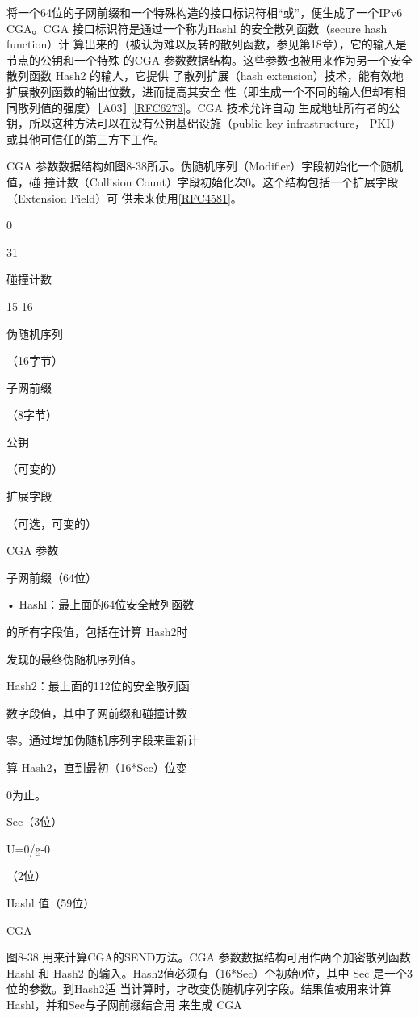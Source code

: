将一个64位的子网前缀和一个特殊构造的接口标识符相“或”，便生成了一个IPv6
CGA。CGA 接口标识符是通过一个称为Hashl 的安全散列函数（secure hash function）计
算出来的（被认为难以反转的散列函数，参见第18章），它的输入是节点的公钥和一个特殊
的CGA 参数数据结构。这些参数也被用来作为另一个安全散列函数 Hash2 的输人，它提供
了散列扩展（hash extension）技术，能有效地扩展散列函数的输出位数，进而提高其安全
性（即生成一个不同的输人但却有相同散列值的强度）［A03］\href{https://www.rfc-editor.org/rfc/rfc6273}{[RFC6273]}。CGA 技术允许自动
生成地址所有者的公钥，所以这种方法可以在没有公钥基础设施（public key infrastructure，
PKI） 或其他可信任的第三方下工作。

CGA 参数数据结构如图8-38所示。伪随机序列（Modifier）字段初始化一个随机值，碰
撞计数（Collision Count）字段初始化次0。这个结构包括一个扩展字段（Extension Field）可
供未来使用\href{https://www.rfc-editor.org/rfc/rfc4581}{[RFC4581]}。

0

31

碰撞计数

15 16

伪随机序列

（16字节）

子网前缀

（8字节）

公钥

（可变的）

扩展字段

（可选，可变的）

CGA 参数

子网前缀（64位）

• Hashl：最上面的64位安全散列函数

的所有字段值，包括在计算 Hash2时

发现的最终伪随机序列值。

Hash2：最上面的112位的安全散列函

数字段值，其中子网前缀和碰撞计数

零。通过增加伪随机序列字段来重新计

算 Hash2，直到最初（16*Sec）位变

0为止。

Sec（3位）

U=0/g-0

（2位）

Hashl 值（59位）

CGA

图8-38 用来计算CGA的SEND方法。CGA 参数数据结构可用作两个加密散列函数 Hashl 和 Hash2
的输入。Hash2值必须有（16*Sec）个初始0位，其中 Sec 是一个3位的参数。到Hash2适
当计算时，才改变伪随机序列字段。结果值被用来计算 Hashl，并和Sec与子网前缀结合用
来生成 CGA

